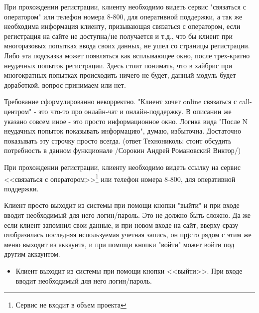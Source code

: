 {


\begin{wiki}
При прохождении регистрации, клиенту необходимо видеть сервис "связаться с оператором" или телефон номера 8-800, для оперативной поддержки, а так же необходима информация клиенту, призывающая связаться с оператором, если регистрация на сайте не доступна/не получается и т.д., что бы клиент при многоразовых попытках ввода своих данных, не ушел со страницы регистрации. Либо эта подсказка может появляться как всплывающее окно, после трех-кратно неудачных попыток регистрации. Здесь стоит понимать, что в хайбрис при многократных попытках происходить ничего не будет, данный модуль будет доработкой. вопрос-принимаем или нет. 
\end{wiki}

\begin{teamidea}
Требование сформулированно некорректно. "Клиент хочет online связаться с call-центром" - это что-то про онлайн-чат и онлайн-поддержку. В описании же указано совсем иное - это просто информационное окно.
Логика вида "После N неудачных попыток показывать информацию", думаю, избыточна. Достаточно показывать эту строчку просто всегда.
(ответ Технониколь: стоит обсудить потребность в данном функционале /Сорокин Андрей Романовский Виктор/)
\end{teamidea}


\begin{itogo}
 При прохождении регистрации, клиенту необходимо видеть ссылку на сервис <<связаться с оператором>>\footnote{Сервис не входит в объем проекта} или телефон номера 8-800, для оперативной поддержки.
\end{itogo}
}

{


\begin{wiki}
Клиент просто выходит из системы при помощи кнопки "выйти" и при входе вводит необходимый для него логин/пароль. Это не должно быть сложно. Да же если клиент запомнил свои данные, и при новом входе на сайт, вверху сразу отобразилась последняя используемая учетная запись, он прjсто рядом с этим же меню выходит из аккаунта, и при помощи кнопки "войти" может войти под другим аккаунтом. 
\end{wiki}


\begin{itemize}
\item Клиент выходит из системы при помощи кнопки <<выйти>>. При входе вводит необходимый для него логин/пароль.  
\end{itemize}
}




